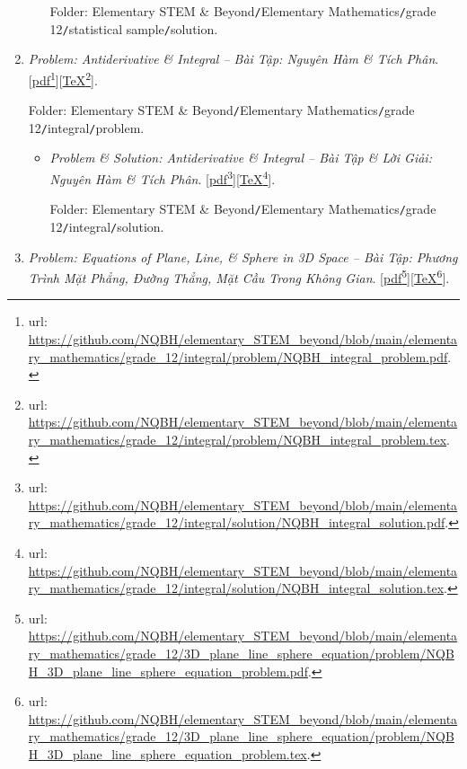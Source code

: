 \documentclass[12pt,oneside]{book}
\begin{document}
\begin{enumerate}
\begin{itemize}
		Folder: {\sf Elementary STEM \& Beyond{\tt/}Elementary Mathematics{\tt/}grade 12{\tt/}statistical sample{\tt/}solution}.
	\end{itemize}
	\item {\it Problem: Antiderivative \& Integral -- Bài Tập: Nguyên Hàm \& Tích Phân}. [\href{https://github.com/NQBH/elementary_STEM_beyond/blob/main/elementary_mathematics/grade_12/integral/problem/NQBH_integral_problem.pdf}{pdf}\footnote{{\sc url}: \url{https://github.com/NQBH/elementary_STEM_beyond/blob/main/elementary_mathematics/grade_12/integral/problem/NQBH_integral_problem.pdf}.}][\href{https://github.com/NQBH/elementary_STEM_beyond/blob/main/elementary_mathematics/grade_12/integral/problem/NQBH_integral_problem.tex}{\TeX}\footnote{{\sc url}: \url{https://github.com/NQBH/elementary_STEM_beyond/blob/main/elementary_mathematics/grade_12/integral/problem/NQBH_integral_problem.tex}.}].
	
	Folder: {\sf Elementary STEM \& Beyond{\tt/}Elementary Mathematics{\tt/}grade 12{\tt/}integral{\tt/}problem}.
	\begin{itemize}
		\item {\it Problem \& Solution: Antiderivative \& Integral -- Bài Tập \& Lời Giải: Nguyên Hàm \& Tích Phân}. [\href{https://github.com/NQBH/elementary_STEM_beyond/blob/main/elementary_mathematics/grade_12/integral/solution/NQBH_integral_solution.pdf}{pdf}\footnote{{\sc url}: \url{https://github.com/NQBH/elementary_STEM_beyond/blob/main/elementary_mathematics/grade_12/integral/solution/NQBH_integral_solution.pdf}.}][\href{https://github.com/NQBH/elementary_STEM_beyond/blob/main/elementary_mathematics/grade_12/integral/solution/NQBH_integral_solution.tex}{\TeX}\footnote{{\sc url}: \url{https://github.com/NQBH/elementary_STEM_beyond/blob/main/elementary_mathematics/grade_12/integral/solution/NQBH_integral_solution.tex}.}].
		
		Folder: {\sf Elementary STEM \& Beyond{\tt/}Elementary Mathematics{\tt/}grade 12{\tt/}integral{\tt/}solution}.
	\end{itemize}
	\item {\it Problem: Equations of Plane, Line, {\it\&} Sphere in 3D Space -- Bài Tập: Phương Trình Mặt Phẳng, Đường Thẳng, Mặt Cầu Trong Không Gian}. [\href{https://github.com/NQBH/elementary_STEM_beyond/blob/main/elementary_mathematics/grade_12/3D_plane_line_sphere_equation/problem/NQBH_3D_plane_line_sphere_equation_problem.pdf}{pdf}\footnote{{\sc url}: \url{https://github.com/NQBH/elementary_STEM_beyond/blob/main/elementary_mathematics/grade_12/3D_plane_line_sphere_equation/problem/NQBH_3D_plane_line_sphere_equation_problem.pdf}.}][\href{https://github.com/NQBH/elementary_STEM_beyond/blob/main/elementary_mathematics/grade_12/3D_plane_line_sphere_equation/problem/NQBH_3D_plane_line_sphere_equation_problem.tex}{\TeX}\footnote{{\sc url}: \url{https://github.com/NQBH/elementary_STEM_beyond/blob/main/elementary_mathematics/grade_12/3D_plane_line_sphere_equation/problem/NQBH_3D_plane_line_sphere_equation_problem.tex}.}].
	

\end{enumerate}
\end{document}
